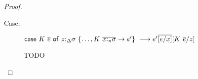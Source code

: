 \begin{proof}
\begin{description}
\item[Case:]
    $\mathsf{case}~K~\overline{e}~\mathsf{of}~z{:}_{\Delta}\sigma~\{\dots,K~\overline{x{:}_\pi\sigma}\to e'\}\ \longrightarrow e'\overline{[e/x]}[K~\overline{e}/z]$
\begin{tabbing}
    TODO

\end{tabbing}
\end{description}
\end{proof}
